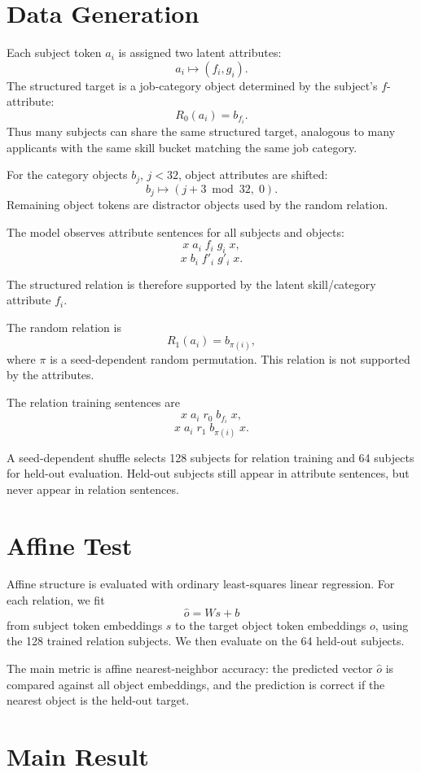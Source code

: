 \documentclass[11pt]{article}
\begin{document}
\section{Data Generation}

Each subject token \(a_i\) is assigned two latent attributes:
\[
  a_i \mapsto (f_i,g_i).
\]
The structured target is a job-category object determined by the subject's
\(f\)-attribute:
\[
  R_0(a_i) = b_{f_i}.
\]
Thus many subjects can share the same structured target, analogous to many applicants
with the same skill bucket matching the same job category.

For the category objects \(b_j\), \(j < 32\), object attributes are shifted:
\[
  b_j \mapsto (j + 3 \bmod 32,\; 0).
\]
Remaining object tokens are distractor objects used by the random relation.

The model observes attribute sentences for all subjects and objects:
\[
  x\; a_i\; f_i\; g_i\; x,
\]
\[
  x\; b_i\; f'_i\; g'_i\; x.
\]

The structured relation is therefore supported by the latent skill/category
attribute \(f_i\).

The random relation is
\[
  R_1(a_i) = b_{\pi(i)},
\]
where \(\pi\) is a seed-dependent random permutation. This relation is not supported
by the attributes.

The relation training sentences are
\[
  x\; a_i\; r_0\; b_{f_i}\; x,
\]
\[
  x\; a_i\; r_1\; b_{\pi(i)}\; x.
\]

A seed-dependent shuffle selects 128 subjects for relation training and 64 subjects
for held-out evaluation. Held-out subjects still appear in attribute sentences, but
never appear in relation sentences.

\section{Affine Test}

Affine structure is evaluated with ordinary least-squares linear regression. For each
relation, we fit
\[
  \hat{o} = W s + b
\]
from subject token embeddings \(s\) to the target object token embeddings \(o\), using
the 128 trained relation subjects. We then evaluate on the 64 held-out subjects.

The main metric is affine nearest-neighbor accuracy: the predicted vector \(\hat{o}\)
is compared against all object embeddings, and the prediction is correct if the
nearest object is the held-out target.

\section{Main Result}
\end{document}
